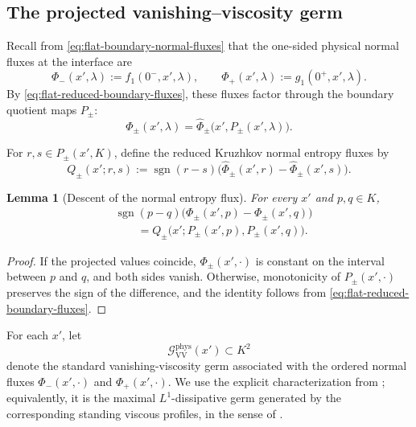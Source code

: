 \documentclass[11pt]{amsart}
\numberwithin{equation}{section}
\theoremstyle{plain}
\newtheorem{lemma}[theorem]{Lemma}
\theoremstyle{definition}
\theoremstyle{remark}
\begin{document}
\subsection{The projected vanishing--viscosity germ}
\label{subsec:flat-vv-germ}

Recall from \eqref{eq:flat-boundary-normal-fluxes} that the one-sided physical
normal fluxes at the interface are
\[
    \Phi_-(x',\lambda)
    :=
    f_1(0^-,x',\lambda),
    \qquad
    \Phi_+(x',\lambda)
    :=
    g_1(0^+,x',\lambda).
\]
By \eqref{eq:flat-reduced-boundary-fluxes}, these fluxes factor through the
boundary quotient maps \(P_\pm\):
\[
    \Phi_\pm(x',\lambda)
    =
    \widehat\Phi_\pm
    \bigl(x',P_\pm(x',\lambda)\bigr).
\]

For \(r,s\in P_\pm(x',K)\), define the reduced Kruzhkov normal entropy
fluxes by
\begin{equation}
\label{eq:flat-reduced-normal-entropy-fluxes}
    Q_\pm(x';r,s)
    :=
    \operatorname{sgn}(r-s)
    \bigl(
        \widehat\Phi_\pm(x',r)
        -
        \widehat\Phi_\pm(x',s)
    \bigr).
\end{equation}
 
\begin{lemma}[Descent of the normal entropy flux]
\label{lem:flat-entropy-flux-descends}
For every \(x'\) and \(p,q\in K\),
\begin{equation}
\label{eq:flat-entropy-flux-descends}
\begin{aligned}
&\operatorname{sgn}(p-q)
\bigl(
    \Phi_\pm(x',p)-\Phi_\pm(x',q)
\bigr)
\\
&\qquad=
Q_\pm
\bigl(
    x';P_\pm(x',p),P_\pm(x',q)
\bigr).
\end{aligned}
\end{equation}
\end{lemma}

\begin{proof}
If the projected values coincide, \(\Phi_\pm(x',\cdot)\) is constant on the
interval between \(p\) and \(q\), and both sides vanish. Otherwise,
monotonicity of \(P_\pm(x',\cdot)\) preserves the sign of the difference,
and the identity follows from
\eqref{eq:flat-reduced-boundary-fluxes}.
\end{proof}

For each \(x'\), let
\[
    \mathcal G_{\mathrm{VV}}^{\mathrm{phys}}(x')
    \subset K^2
\]
denote the standard vanishing-viscosity germ associated with the ordered
normal fluxes \(\Phi_-(x',\cdot)\) and \(\Phi_+(x',\cdot)\). We use the
explicit characterization from \cite[formula~(42)]{AM}; equivalently, it is
the maximal \(L^1\)-dissipative germ generated by the corresponding standing
viscous profiles, in the sense of \cite[Section~5]{AKR}.
\end{document}
